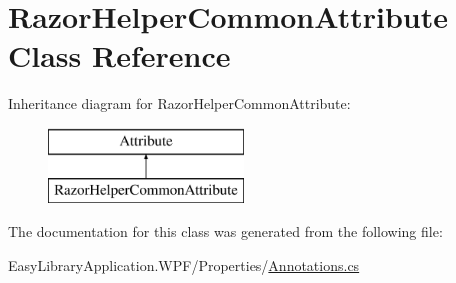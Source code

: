 \hypertarget{class_razor_helper_common_attribute}{}\section{Razor\+Helper\+Common\+Attribute Class Reference}
\label{class_razor_helper_common_attribute}
Inheritance diagram for Razor\+Helper\+Common\+Attribute\+:\begin{figure}[H]
\begin{center}
\leavevmode
\includegraphics[height=2.000000cm]{class_razor_helper_common_attribute}
\end{center}
\end{figure}


The documentation for this class was generated from the following file\+:\begin{DoxyCompactItemize}
\item 
Easy\+Library\+Application.\+W\+P\+F/\+Properties/\mbox{\hyperlink{_annotations_8cs}{Annotations.\+cs}}\end{DoxyCompactItemize}
